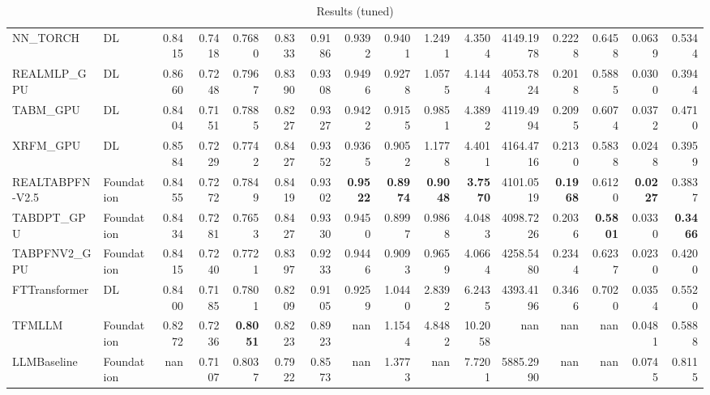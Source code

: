 \begin{table}[htbp]
{\begin{tabular}{ll|rrrrrrrrrrrrrr}
NN\_TORCH & DL & 0.8415 & 0.7418 & 0.7680 & 0.8333 & 0.9186 & 0.9392 & 0.9401 & 1.2491 & 4.3504 & 4149.1978 & 0.2228 & 0.6458 & 0.0639 & 0.5344 \\
REALMLP\_GPU & DL & 0.8660 & 0.7248 & 0.7967 & 0.8390 & 0.9308 & 0.9496 & 0.9278 & 1.0575 & 4.1444 & 4053.7824 & 0.2018 & 0.5885 & 0.0300 & 0.3944 \\
TABM\_GPU & DL & 0.8404 & 0.7151 & 0.7885 & 0.8227 & 0.9327 & 0.9422 & 0.9155 & 0.9851 & 4.3892 & 4119.4994 & 0.2095 & 0.6074 & 0.0372 & 0.4710 \\
XRFM\_GPU & DL & 0.8584 & 0.7229 & 0.7742 & 0.8427 & 0.9352 & 0.9365 & 0.9052 & 1.1778 & 4.4011 & 4164.4716 & 0.2130 & 0.5838 & 0.0248 & 0.3959 \\
REALTABPFN-V2.5 & Foundation & 0.8455 & 0.7272 & 0.7849 & 0.8419 & 0.9302 & \textbf{0.9522} & \textbf{0.8974} & \textbf{0.9048} & \textbf{3.7570} & 4101.0519 & \textbf{0.1968} & 0.6120 & \textbf{0.0227} & 0.3837 \\
TABDPT\_GPU & Foundation & 0.8434 & 0.7281 & 0.7653 & 0.8427 & 0.9330 & 0.9450 & 0.8997 & 0.9868 & 4.0483 & 4098.7226 & 0.2036 & \textbf{0.5801} & 0.0330 & \textbf{0.3466} \\
TABPFNV2\_GPU & Foundation & 0.8415 & 0.7240 & 0.7721 & 0.8397 & 0.9233 & 0.9446 & 0.9093 & 0.9659 & 4.0664 & 4258.5480 & 0.2344 & 0.6237 & 0.0230 & 0.4200 \\
\midrule
FTTransformer & DL & 0.8400 & 0.7185 & 0.7801 & 0.8209 & 0.9105 & 0.9259 & 1.0440 & 2.8392 & 6.2435 & 4393.4196 & 0.3466 & 0.7020 & 0.0354 & 0.5520 \\
TFMLLM & Foundation & 0.8272 & 0.7236 & \textbf{0.8051} & 0.8223 & 0.8923 & nan & 1.1544 & 4.8482 & 10.2058 & nan & nan & nan & 0.0481 & 0.5888 \\
LLMBaseline & Foundation & nan & 0.7107 & 0.8037 & 0.7922 & 0.8573 & nan & 1.3773 & nan & 7.7201 & 5885.2990 & nan & nan & 0.0745 & 0.8115 \\
\bottomrule
\end{tabular}
}
\caption{Results (tuned)}
\label{tab:results_tuned}
\end{table}